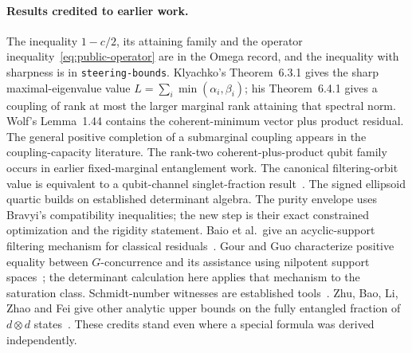 \documentclass[11pt,a4paper]{article}
\theoremstyle{remark}\newtheorem{remark}[theorem]{Remark}
\begin{document}
\paragraph{Results credited to earlier work.}
The inequality $1-c/2$, its attaining family and the operator
inequality~\eqref{eq:public-operator} are in the Omega record, and the
inequality with sharpness is in \texttt{steering-bounds}. Klyachko's
Theorem~6.3.1 gives the sharp maximal-eigenvalue value
$L=\sum_i\min(\alpha_i,\beta_i)$; his Theorem~6.4.1 gives a coupling of rank
at most the larger marginal rank attaining that spectral norm. Wolf's
Lemma~1.44 contains the coherent-minimum vector plus product residual. The
general positive completion of a submarginal coupling appears in the
coupling-capacity literature. The rank-two coherent-plus-product qubit family
occurs in earlier fixed-marginal entanglement work. The canonical
filtering-orbit value is equivalent to a qubit-channel singlet-fraction
result~\cite{pal}. The signed ellipsoid quartic builds on established
determinant algebra. The purity envelope uses Bravyi's compatibility
inequalities; the new step is their exact constrained optimization and the
rigidity statement. Baio et al.\ give an acyclic-support filtering mechanism
for classical residuals~\cite{baio}. Gour and Guo characterize positive
equality between $G$-concurrence and its assistance using nilpotent support
spaces~\cite{gourguo}; the determinant calculation here applies that
mechanism to the saturation class. Schmidt-number witnesses are established
tools~\cite{terhalhorodecki,sentis}. Zhu, Bao, Li, Zhao and Fei give other
analytic upper bounds on the fully entangled fraction of $d\otimes d$
states~\cite{zhu}. These credits stand even where a special formula was
derived independently.
\end{document}
